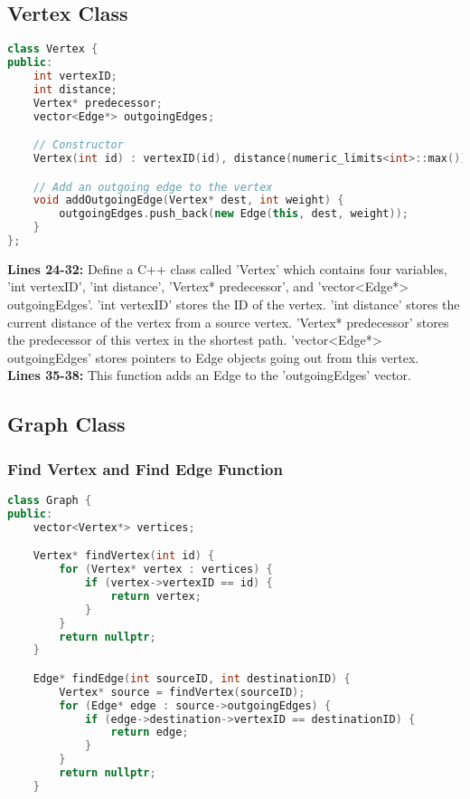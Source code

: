 \documentclass[letterpaper, 10pt,DIV=13]{scrartcl}
\numberwithin{equation}{section} %
\numberwithin{figure}{section} %
\numberwithin{table}{section} %
\begin{document}
\subsection{Vertex Class}
\begin{linenumbers}
\begin{lstlisting}[language=C++, caption={Vertex Class}, label={code:example}]
class Vertex {
public:
    int vertexID;
    int distance;
    Vertex* predecessor;
    vector<Edge*> outgoingEdges;

    // Constructor
    Vertex(int id) : vertexID(id), distance(numeric_limits<int>::max()), predecessor(nullptr) {}

    // Add an outgoing edge to the vertex
    void addOutgoingEdge(Vertex* dest, int weight) {
        outgoingEdges.push_back(new Edge(this, dest, weight));
    }
};
\end{lstlisting}
\end{linenumbers}
\nolinenumbers

\textbf{Lines 24-32:} Define a C++ class called ’Vertex’ which contains four variables, ’int vertexID’, ’int distance’, 'Vertex* predecessor', and ’vector<Edge*> outgoingEdges’. ’int vertexID’ stores the ID of the vertex. ’int distance’ stores the current distance of the vertex from a source vertex. 'Vertex* predecessor' stores the predecessor of this vertex in the shortest path. ’vector<Edge*> outgoingEdges’ stores pointers to Edge objects going out from this vertex. \\
\textbf{Lines 35-38:} This function adds an Edge to the 'outgoingEdges' vector.


\subsection{Graph Class}
\subsubsection{Find Vertex and Find Edge Function}
\begin{linenumbers}
\begin{lstlisting}[language=C++, caption={Find Vertex and Find Edge Function}, label={code:example}]
class Graph {
public:
    vector<Vertex*> vertices;

    Vertex* findVertex(int id) {
        for (Vertex* vertex : vertices) {
            if (vertex->vertexID == id) {
                return vertex;
            }
        }
        return nullptr;
    }

    Edge* findEdge(int sourceID, int destinationID) {
        Vertex* source = findVertex(sourceID);
        for (Edge* edge : source->outgoingEdges) {
            if (edge->destination->vertexID == destinationID) {
                return edge;
            }
        }
        return nullptr;
    }
\end{lstlisting}
\end{linenumbers}
\nolinenumbers
\end{document}
